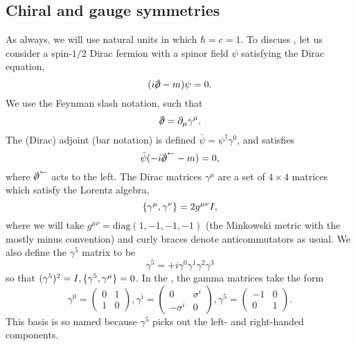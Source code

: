 \subsection*{Chiral and gauge symmetries} As always, we will use natural units in which $\hbar = c = 1$. To discuss , let us consider a spin-$1/2$ Dirac fermion with a spinor field $\psi$ satisfying the Dirac equation,
\begin{equation}
    (i\slashed{\p}-m)\psi=0.
\end{equation}
We use the Feynman slash notation, such that
\begin{equation*}
    \slashed{\p}=\p_\mu \gamma^\mu.
\end{equation*}
The (Dirac) adjoint (bar notation) is defined $\bar \psi = \psi^\dagger \gamma^0$, and satisfies
\begin{equation}
    \bar \psi(-i \slashed{\p}^{\leftarrow}-m)=0,
\end{equation}
where $\slashed{\p}^{\leftarrow}$ acts to the left. The Dirac matrices $\gamma^\mu$ are a set of $4\times 4$ matrices which satisfy the Lorentz algebra,
\begin{equation}
    \{\gamma^\mu,\gamma^\nu\}=2g^{\mu\nu}I,
\end{equation}
where we will take $g^{\mu\nu}=\text{diag}(1,-1,-1,-1)$ (the Minkowski metric with the mostly minus convention) and curly braces denote anticommutators as usual. We also define the $\gamma^5$ matrix to be
\begin{equation}
    \gamma^5= +i\gamma^0 \gamma^1 \gamma^2 \gamma^3
\end{equation}
so that $(\gamma^5)^2=I,\{\gamma^5,\gamma^\mu\}=0$. In the , the gamma matrices take the form
\begin{equation}
    \gamma^0=\begin{pmatrix}
        0&1\\
        1&0
    \end{pmatrix},
    \gamma^i=\begin{pmatrix}
        0&\sigma^i\\
        -\sigma^i&0
    \end{pmatrix},
    \gamma^5=\begin{pmatrix}
        -1&0\\
        0&1
    \end{pmatrix}.
\end{equation}
This basis is so named because $\gamma^5$ picks out the left- and right-handed components.

